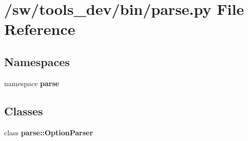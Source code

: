 \section{/sw/tools\_\-dev/bin/parse.py File Reference}
\label{parse_8py}
\subsection*{Namespaces}
\begin{CompactItemize}
\item 
namespace {\bf parse}
\end{CompactItemize}
\subsection*{Classes}
\begin{CompactItemize}
\item 
class {\bf parse::OptionParser}
\end{CompactItemize}
